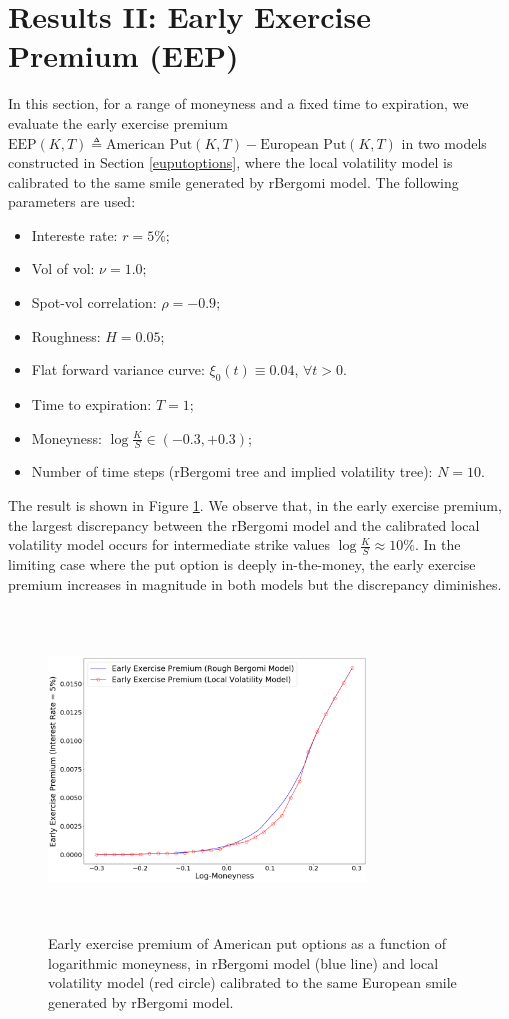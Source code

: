 \documentclass[12pt]{article}
\numberwithin{equation}{section}
\begin{document}
\section{Results II: Early Exercise Premium (EEP)}
In this section, for a range of moneyness and a fixed time to expiration, we evaluate the early exercise premium $\text{EEP}(K,T) \triangleq \text{American Put}(K,T) - \text{European Put}(K,T)$ in two models constructed in Section \ref{euputoptions}, where the local volatility model is calibrated to the same smile generated by rBergomi model. The following parameters are used:
\begin{itemize}[noitemsep]
\item Intereste rate: $r=5\%$;
\item Vol of vol: $\nu = 1.0$;
\item Spot-vol correlation: $\rho = -0.9$;
\item Roughness: $H = 0.05$;
\item Flat forward variance curve: $\xi_0(t)\equiv 0.04$, $\forall t>0$.
\item Time to expiration: $T=1$;
\item Moneyness: $\log\frac{K}{S} \in (-0.3, + 0.3)$;
\item Number of time steps (rBergomi tree and implied volatility tree): $N=10$.
\end{itemize}
The result is shown in Figure \ref{fig:eep}. We observe that, in the early exercise premium, the largest discrepancy between the rBergomi model and the calibrated local volatility model occurs for intermediate strike values $\log\frac{K}{S}\approx 10\%$. In the limiting case where the put option is deeply in-the-money, the early exercise premium increases in magnitude in both models but the discrepancy diminishes.

\begin{figure}[!htb]
\begin{center}
  \includegraphics[width=0.75\textwidth, height=8.5cm]{eep}
\caption{Early exercise premium of American put options as a function of logarithmic moneyness, in rBergomi model (blue line) and local volatility model (red circle) calibrated to the same European smile generated by rBergomi model.}
\label{fig:eep}
\end{center}
\end{figure}
\end{document}
